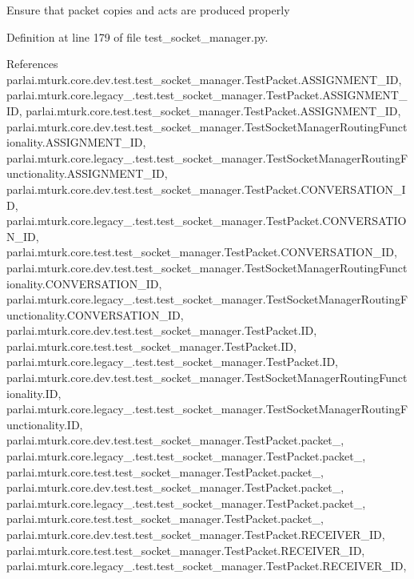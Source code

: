 \begin{DoxyVerb}Ensure that packet copies and acts are produced properly\end{DoxyVerb}
 

Definition at line 179 of file test\+\_\+socket\+\_\+manager.\+py.



References parlai.\+mturk.\+core.\+dev.\+test.\+test\+\_\+socket\+\_\+manager.\+Test\+Packet.\+A\+S\+S\+I\+G\+N\+M\+E\+N\+T\+\_\+\+ID, parlai.\+mturk.\+core.\+legacy\+\_.\+test.\+test\+\_\+socket\+\_\+manager.\+Test\+Packet.\+A\+S\+S\+I\+G\+N\+M\+E\+N\+T\+\_\+\+ID, parlai.\+mturk.\+core.\+test.\+test\+\_\+socket\+\_\+manager.\+Test\+Packet.\+A\+S\+S\+I\+G\+N\+M\+E\+N\+T\+\_\+\+ID, parlai.\+mturk.\+core.\+dev.\+test.\+test\+\_\+socket\+\_\+manager.\+Test\+Socket\+Manager\+Routing\+Functionality.\+A\+S\+S\+I\+G\+N\+M\+E\+N\+T\+\_\+\+ID, parlai.\+mturk.\+core.\+legacy\+\_.\+test.\+test\+\_\+socket\+\_\+manager.\+Test\+Socket\+Manager\+Routing\+Functionality.\+A\+S\+S\+I\+G\+N\+M\+E\+N\+T\+\_\+\+ID, parlai.\+mturk.\+core.\+dev.\+test.\+test\+\_\+socket\+\_\+manager.\+Test\+Packet.\+C\+O\+N\+V\+E\+R\+S\+A\+T\+I\+O\+N\+\_\+\+ID, parlai.\+mturk.\+core.\+legacy\+\_.\+test.\+test\+\_\+socket\+\_\+manager.\+Test\+Packet.\+C\+O\+N\+V\+E\+R\+S\+A\+T\+I\+O\+N\+\_\+\+ID, parlai.\+mturk.\+core.\+test.\+test\+\_\+socket\+\_\+manager.\+Test\+Packet.\+C\+O\+N\+V\+E\+R\+S\+A\+T\+I\+O\+N\+\_\+\+ID, parlai.\+mturk.\+core.\+dev.\+test.\+test\+\_\+socket\+\_\+manager.\+Test\+Socket\+Manager\+Routing\+Functionality.\+C\+O\+N\+V\+E\+R\+S\+A\+T\+I\+O\+N\+\_\+\+ID, parlai.\+mturk.\+core.\+legacy\+\_.\+test.\+test\+\_\+socket\+\_\+manager.\+Test\+Socket\+Manager\+Routing\+Functionality.\+C\+O\+N\+V\+E\+R\+S\+A\+T\+I\+O\+N\+\_\+\+ID, parlai.\+mturk.\+core.\+dev.\+test.\+test\+\_\+socket\+\_\+manager.\+Test\+Packet.\+ID, parlai.\+mturk.\+core.\+test.\+test\+\_\+socket\+\_\+manager.\+Test\+Packet.\+ID, parlai.\+mturk.\+core.\+legacy\+\_.\+test.\+test\+\_\+socket\+\_\+manager.\+Test\+Packet.\+ID, parlai.\+mturk.\+core.\+dev.\+test.\+test\+\_\+socket\+\_\+manager.\+Test\+Socket\+Manager\+Routing\+Functionality.\+ID, parlai.\+mturk.\+core.\+legacy\+\_.\+test.\+test\+\_\+socket\+\_\+manager.\+Test\+Socket\+Manager\+Routing\+Functionality.\+ID, parlai.\+mturk.\+core.\+dev.\+test.\+test\+\_\+socket\+\_\+manager.\+Test\+Packet.\+packet\+\_, parlai.\+mturk.\+core.\+legacy\+\_.\+test.\+test\+\_\+socket\+\_\+manager.\+Test\+Packet.\+packet\+\_, parlai.\+mturk.\+core.\+test.\+test\+\_\+socket\+\_\+manager.\+Test\+Packet.\+packet\+\_, parlai.\+mturk.\+core.\+dev.\+test.\+test\+\_\+socket\+\_\+manager.\+Test\+Packet.\+packet\+\_, parlai.\+mturk.\+core.\+legacy\+\_.\+test.\+test\+\_\+socket\+\_\+manager.\+Test\+Packet.\+packet\+\_, parlai.\+mturk.\+core.\+test.\+test\+\_\+socket\+\_\+manager.\+Test\+Packet.\+packet\+\_, parlai.\+mturk.\+core.\+dev.\+test.\+test\+\_\+socket\+\_\+manager.\+Test\+Packet.\+R\+E\+C\+E\+I\+V\+E\+R\+\_\+\+ID, parlai.\+mturk.\+core.\+test.\+test\+\_\+socket\+\_\+manager.\+Test\+Packet.\+R\+E\+C\+E\+I\+V\+E\+R\+\_\+\+ID, parlai.\+mturk.\+core.\+legacy\+\_.\+test.\+test\+\_\+socket\+\_\+manager.\+Test\+Packet.\+R\+E\+C\+E\+I\+V\+E\+R\+\_\+\+ID, 